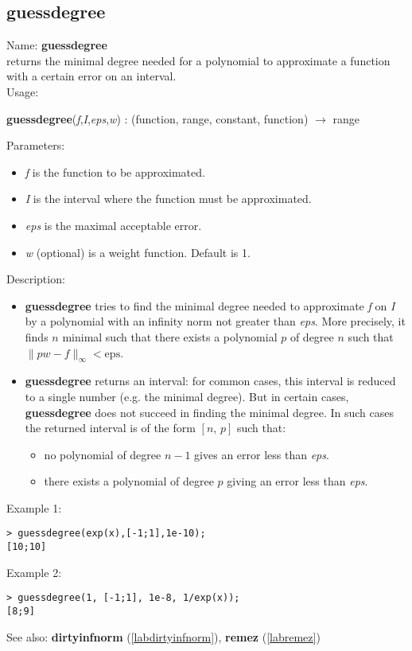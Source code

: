 \subsection{guessdegree}
\label{labguessdegree}
\noindent Name: \textbf{guessdegree}\\
returns the minimal degree needed for a polynomial to approximate a function with a certain error on an interval.\\
\noindent Usage: 
\begin{center}
\textbf{guessdegree}(\emph{f},\emph{I},\emph{eps},\emph{w}) : (\textsf{function}, \textsf{range}, \textsf{constant}, \textsf{function}) $\rightarrow$ \textsf{range}
\\ 
\end{center}
Parameters: 
\begin{itemize}
\item \emph{f} is the function to be approximated.
\item \emph{I} is the interval where the function must be approximated.
\item \emph{eps} is the maximal acceptable error.
\item \emph{w} (optional) is a weight function. Default is 1.
\end{itemize}
\noindent Description: \begin{itemize}

\item \textbf{guessdegree} tries to find the minimal degree needed to approximate \emph{f}
   on \emph{I} by a polynomial with an infinity norm not greater than \emph{eps}.
   More precisely, it finds $n$ minimal such that there exists a
   polynomial $p$ of degree $n$ such that $\|pw-f\|_{\infty} < \mathrm{eps}$.

\item \textbf{guessdegree} returns an interval: for common cases, this interval is reduced to a 
   single number (e.g. the minimal degree). But in certain cases, \textbf{guessdegree} does
   not succeed in finding the minimal degree. In such cases the returned interval
   is of the form $[n,\,p]$ such that:
   \begin{itemize}
   \item no polynomial of degree $n-1$ gives an error less than \emph{eps}.
   \item there exists a polynomial of degree $p$ giving an error less than \emph{eps}. 
   \end{itemize}
\end{itemize}
\noindent Example 1: 
\begin{center}\begin{minipage}{15cm}\begin{Verbatim}[frame=single]
> guessdegree(exp(x),[-1;1],1e-10);
[10;10]
\end{Verbatim}
\end{minipage}\end{center}
\noindent Example 2: 
\begin{center}\begin{minipage}{15cm}\begin{Verbatim}[frame=single]
> guessdegree(1, [-1;1], 1e-8, 1/exp(x));
[8;9]
\end{Verbatim}
\end{minipage}\end{center}
See also: \textbf{dirtyinfnorm} (\ref{labdirtyinfnorm}), \textbf{remez} (\ref{labremez})
